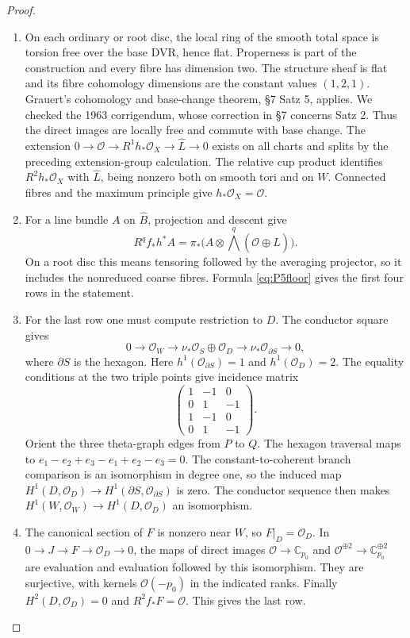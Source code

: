 \begin{proof}
\begin{enumerate}[label=\arabic*.,leftmargin=*]
\item On each ordinary or root disc, the local ring of the smooth total
space is torsion free over the base DVR, hence flat.  Properness is part
of the construction and every fibre has dimension two.  The structure
sheaf is flat and its fibre cohomology dimensions are the constant
values $(1,2,1)$.  Grauert's cohomology and base-change theorem, \S7
Satz 5, applies.  We checked the 1963 corrigendum, whose correction in
\S7 concerns Satz 2.  Thus the direct images are locally free and commute
with base change.  The extension
$0\to\mathcal O\to R^1h_*\mathcal O_X\to\widehat L\to0$ exists on all
charts and splits by the preceding extension-group calculation.  The
relative cup product identifies $R^2h_*\mathcal O_X$ with $\widehat L$,
being nonzero both on smooth tori and on $W$.  Connected fibres and the
maximum principle give $h_*\mathcal O_X=\mathcal O$.

\item For a line bundle $A$ on $\widehat B$, projection and descent give
\[
 R^qf_*h^*A=\pi_*\bigl(A\otimes
              \bigwedge^q(\mathcal O\oplus\widehat L)\bigr).
\]
On a root disc this means tensoring followed by the averaging
projector, so it includes the nonreduced coarse fibres.  Formula
\eqref{eq:P5floor} gives the first four rows in the statement.

\item For the last row one must compute restriction to $D$.  The conductor
square gives
\[
0\to\mathcal O_W\to\nu_*\mathcal O_S\oplus\mathcal O_D
\to\nu_*\mathcal O_{\partial S}\to0,
\]
where $\partial S$ is the hexagon.  Here $h^1(\mathcal O_{\partial S})=1$
and $h^1(\mathcal O_D)=2$.  The equality conditions at the two triple
points give incidence matrix
\[
 \begin{pmatrix}1&-1&0\\0&1&-1\\1&-1&0\\0&1&-1\end{pmatrix}.
\]
Orient the three theta-graph edges from $P$ to $Q$.  The hexagon
traversal maps to $e_1-e_2+e_3-e_1+e_2-e_3=0$.  The constant-to-coherent
branch comparison is an isomorphism in degree one, so the induced map
$H^1(D,\mathcal O_D)\to H^1(\partial S,\mathcal O_{\partial S})$ is
zero.  The conductor sequence then makes
$H^1(W,\mathcal O_W)\to H^1(D,\mathcal O_D)$ an isomorphism.

\item The canonical section of $F$ is nonzero near $W$, so $F|_D=\mathcal O_D$.
In $0\to J\to F\to\mathcal O_D\to0$, the maps of direct images
$\mathcal O\to\mathbb C_{p_0}$ and
$\mathcal O^{\oplus2}\to\mathbb C_{p_0}^{\oplus2}$ are evaluation and
evaluation followed by this isomorphism.  They are surjective, with
kernels $\mathcal O(-p_0)$ in the indicated ranks.  Finally
$H^2(D,\mathcal O_D)=0$ and $R^2f_*F=\mathcal O$.  This gives the last row.
\end{enumerate}
\end{proof}

